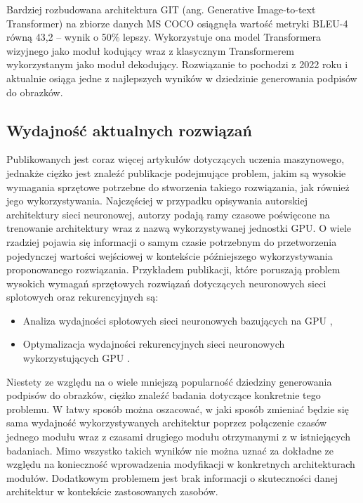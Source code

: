 Bardziej rozbudowana architektura GIT (ang. Generative Image-to-text Transformer) \cite{wang2022git} na zbiorze danych MS COCO osiągnęła wartość metryki BLEU-4 równą 43,2 -- wynik o 50\% lepszy. Wykorzystuje ona model Transformera wizyjnego jako moduł kodujący wraz z klasycznym Transformerem wykorzystanym jako moduł dekodujący. Rozwiązanie to pochodzi z 2022 roku i aktualnie osiąga jedne z najlepszych wyników w dziedzinie generowania podpisów do obrazków.
\subsection{Wydajność aktualnych rozwiązań}
Publikowanych jest coraz więcej artykułów dotyczących uczenia maszynowego, jednakże ciężko jest znaleźć publikacje podejmujące problem, jakim są wysokie wymagania sprzętowe potrzebne do stworzenia takiego rozwiązania, jak również jego wykorzystywania. Najczęściej w przypadku opisywania autorskiej architektury sieci neuronowej, autorzy podają ramy czasowe poświęcone na trenowanie architektury wraz z nazwą wykorzystywanej jednostki GPU. O wiele rzadziej pojawia się informacji o samym czasie potrzebnym do przetworzenia pojedynczej wartości wejściowej w kontekście późniejszego wykorzystywania proponowanego rozwiązania.
Przykładem publikacji, które poruszają problem wysokich wymagań sprzętowych rozwiązań dotyczących neuronowych sieci splotowych oraz rekurencyjnych są:
\begin{itemize}
    \item Analiza wydajności splotowych sieci neuronowych bazujących na GPU \cite{cnn-compare},
    \item Optymalizacja wydajności rekurencyjnych sieci neuronowych wykorzystujących GPU \cite{rnn-compare}.
\end{itemize}
Niestety ze względu na o wiele mniejszą popularność dziedziny generowania podpisów do obrazków, ciężko znaleźć badania dotyczące konkretnie tego problemu. W łatwy sposób można oszacować, w jaki sposób zmieniać będzie się sama wydajność wykorzystywanych architektur poprzez połączenie czasów jednego modułu wraz z czasami drugiego modułu otrzymanymi z w istniejących badaniach. Mimo wszystko takich wyników nie można uznać za dokładne ze względu na konieczność wprowadzenia modyfikacji w konkretnych architekturach modułów. Dodatkowym problemem jest brak informacji o skuteczności danej architektur w kontekście zastosowanych zasobów.
